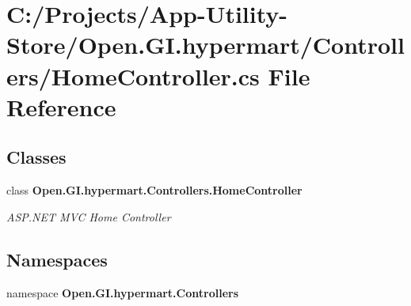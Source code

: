 \section{C\+:/\+Projects/\+App-\/\+Utility-\/\+Store/\+Open.G\+I.\+hypermart/\+Controllers/\+Home\+Controller.cs File Reference}
\label{_home_controller_8cs}
\subsection*{Classes}
\begin{DoxyCompactItemize}
\item 
class \textbf{ Open.\+G\+I.\+hypermart.\+Controllers.\+Home\+Controller}
\begin{DoxyCompactList}\small\item\em A\+S\+P.\+N\+ET M\+VC Home Controller \end{DoxyCompactList}\end{DoxyCompactItemize}
\subsection*{Namespaces}
\begin{DoxyCompactItemize}
\item 
namespace \textbf{ Open.\+G\+I.\+hypermart.\+Controllers}
\end{DoxyCompactItemize}
